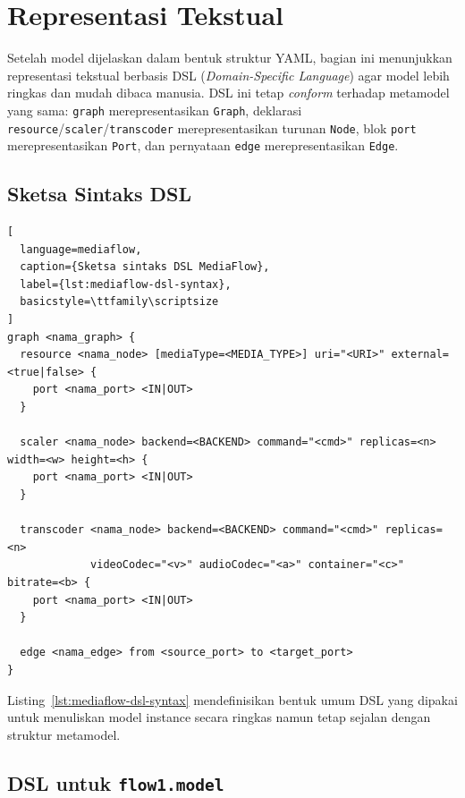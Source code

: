 \section{Representasi Tekstual}
\label{sec:representasi-tekstual}

Setelah model dijelaskan dalam bentuk struktur YAML, bagian ini menunjukkan representasi tekstual berbasis DSL (\textit{Domain-Specific Language}) agar model lebih ringkas dan mudah dibaca manusia. DSL ini tetap \textit{conform} terhadap metamodel yang sama: \texttt{graph} merepresentasikan \texttt{Graph}, deklarasi \texttt{resource}/\texttt{scaler}/\texttt{transcoder} merepresentasikan turunan \texttt{Node}, blok \texttt{port} merepresentasikan \texttt{Port}, dan pernyataan \texttt{edge} merepresentasikan \texttt{Edge}.

\subsection{Sketsa Sintaks DSL}

\begin{lstlisting}[
  language=mediaflow,
  caption={Sketsa sintaks DSL MediaFlow},
  label={lst:mediaflow-dsl-syntax},
  basicstyle=\ttfamily\scriptsize
]
graph <nama_graph> {
  resource <nama_node> [mediaType=<MEDIA_TYPE>] uri="<URI>" external=<true|false> {
    port <nama_port> <IN|OUT>
  }

  scaler <nama_node> backend=<BACKEND> command="<cmd>" replicas=<n> width=<w> height=<h> {
    port <nama_port> <IN|OUT>
  }

  transcoder <nama_node> backend=<BACKEND> command="<cmd>" replicas=<n>
             videoCodec="<v>" audioCodec="<a>" container="<c>" bitrate=<b> {
    port <nama_port> <IN|OUT>
  }

  edge <nama_edge> from <source_port> to <target_port>
}
\end{lstlisting}

\label{subsec:dsl-syntax}
\noindent Listing~\ref{lst:mediaflow-dsl-syntax} mendefinisikan bentuk umum DSL yang dipakai untuk menuliskan model instance secara ringkas namun tetap sejalan dengan struktur metamodel.

\subsection{DSL untuk \texttt{flow1.model}}

